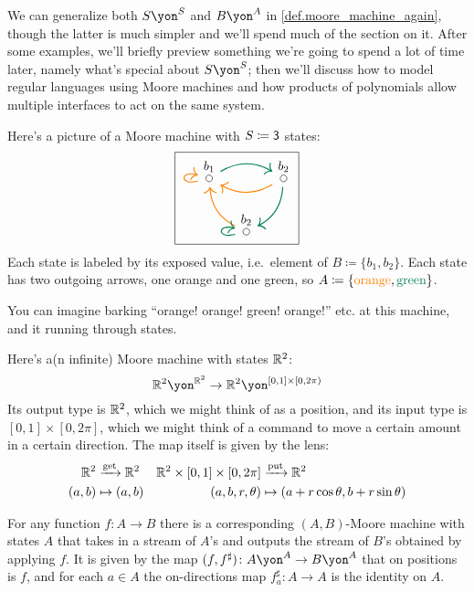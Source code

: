 \documentclass[DynamicalBook]{subfiles}
\begin{document}
We can generalize both $S\yon^S$ and $B\yon^A$ in \cref{def.moore_machine_again}, though the latter is much simpler and we'll spend much of the section on it. After some examples, we'll briefly preview something we're going to spend a lot of time later, namely what's special about $S\yon^S$; then we'll discuss how to model regular languages using Moore machines and how products of polynomials allow multiple interfaces to act on the same system.

\begin{example}\label{ex.Moore_three}
Here's a picture of a Moore machine with $S\coloneqq\textsf{3}$ states:
\[
\begin{tikzpicture}
	\node[draw] {
  \begin{tikzcd}[column sep=small]
  	\LMO{b_1}\ar[rr, dgreen, thick, bend left]\ar[loop left, thick, orange]&&
  	\LMO{b_2}\ar[ll, thick, orange, bend left]\ar[dl, bend left, thick, dgreen]\\&
  	\LMO{b_2} \ar[ul, thick, orange, bend left] \ar[loop left, thick, dgreen]
  \end{tikzcd}
  };
\end{tikzpicture}
\]
Each state is labeled by its exposed value, i.e.\ element of $B\coloneqq\{b_1,b_2\}$. Each state has two outgoing arrows, one orange and one green, so $A\coloneqq\{{\color{orange}\text{orange}},{\color{dgreen}\text{green}}\}$.

You can imagine barking ``orange! orange! green! orange!'' etc. at this machine, and it running through states.
\end{example}

\begin{example}\label{ex.R2_moore}
Here's a(n infinite) Moore machine with states $\mathbb{R}^2$:
\[
\rr^2\yon^{\rr^2}\to\rr^2\yon^{[0,1]\times[0,2\pi)}%
\]
Its output type is $\mathbb{R}^2$, which we might think of as a position, and its input type is $[0,1]\times[0,2\pi]$, which we might think of a command to move a certain amount in a certain direction. The map itself is given by the lens:
\begin{align*}
  \mathbb{R}^2&\xrightarrow{\text{get}}\mathbb{R}^2&
  \mathbb{R}^2\times[0,1]\times[0,2\pi]&\xrightarrow{\text{put}}\mathbb{R}^2\\
  (a,b)&\mapsto(a,b)&
  (a,b,r,\theta)&\mapsto(a+r\cos\theta, b+r\sin\theta)
\end{align*}
\end{example}

\begin{example}\label{ex.funs_to_moore}
For any function $f\colon A\to B$ there is a corresponding $(A,B)$-Moore machine with states $A$ that takes in a stream of $A$'s and outputs the stream of $B$'s obtained by applying $f$. It is given by the map $(f,f^\sharp)\colon A\yon^A\to B\yon^A$ that on positions is $f$, and for each $a\in A$ the on-directions map $f^\sharp_a\colon A\to A$ is the identity on $A$.
\end{example}
\end{document}
